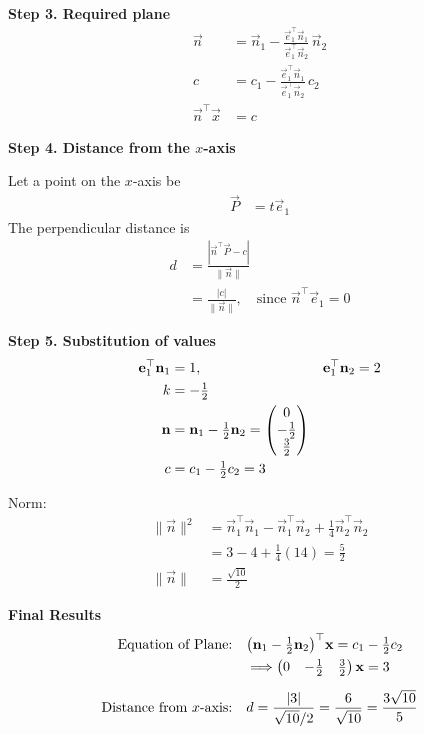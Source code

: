 \documentclass[12pt]{article}
\begin{document}
\textbf{Step 3. Required plane}
\begin{align}
\vec{n} &= \vec{n}_1 - \frac{\vec{e}_1^\top \vec{n}_1}{\vec{e}_1^\top \vec{n}_2}\,\vec{n}_2 \\
c &= c_1 - \frac{\vec{e}_1^\top \vec{n}_1}{\vec{e}_1^\top \vec{n}_2}\,c_2 \\
\vec{n}^\top \vec{x} &= c
\end{align}

\textbf{Step 4. Distance from the $x$-axis}

Let a point on the $x$-axis be
\begin{align}
\vec{P} &= t \vec{e}_1
\end{align}
The perpendicular distance is
\begin{align}
d &= \frac{\left|\vec{n}^\top \vec{P} - c\right|}{\|\vec{n}\|} \\
&= \frac{|c|}{\|\vec{n}\|}, \quad \text{since } \vec{n}^\top \vec{e}_1 = 0
\end{align}

\textbf{Step 5. Substitution of values}
\begin{align}
\mathbf{e}_1^\top \mathbf{n}_1 &= 1, & \mathbf{e}_1^\top \mathbf{n}_2 &= 2 \\
k &= -\tfrac{1}{2} \\
\mathbf{n} &= \mathbf{n}_1 - \tfrac{1}{2}\mathbf{n}_2 = \begin{pmatrix}0\\ -\tfrac12 \\ \tfrac32\end{pmatrix} \\
c &= c_1 - \tfrac{1}{2} c_2 = 3
\end{align}

Norm:
\begin{align}
\|\vec{n}\|^2 &= \vec{n}_1^\top \vec{n}_1 
- \vec{n}_1^\top \vec{n}_2 
+ \tfrac{1}{4}\vec{n}_2^\top \vec{n}_2 \\
&= 3 - 4 + \tfrac{1}{4}(14) = \tfrac{5}{2} \\
\|\vec{n}\| &= \tfrac{\sqrt{10}}{2}
\end{align}

\textbf{Final Results}
\begin{align}
\text{Equation of Plane:} \quad 
&\big(\mathbf{n}_1 - \tfrac{1}{2}\mathbf{n}_2\big)^\top \mathbf{x} = c_1 - \tfrac{1}{2}c_2 \\
&\Longrightarrow \begin{pmatrix}0 & -\tfrac12 & \tfrac32\end{pmatrix}\mathbf{x} = 3 \\[6pt]
\text{Distance from $x$-axis:} \quad 
&d = \frac{|3|}{\sqrt{10}/2} = \frac{6}{\sqrt{10}} = \frac{3\sqrt{10}}{5}
\end{align}
\end{document}
